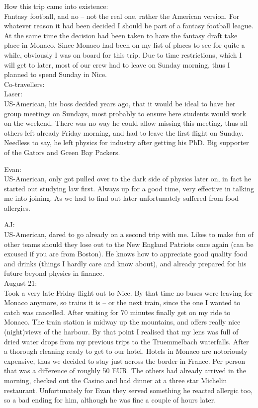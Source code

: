 How this trip came into existence:\\
Fantasy football, and no -- not the real one, rather the American version. For whatever reason it had been decided I should be part of a fantasy football league. At the same time the decision had been taken to have the fantasy draft take place in Monaco. Since Monaco had been on my list of places to see for quite a while, obviously I was on board for this trip. Due to time restrictions, which I will get to later, most of our crew had to leave on Sunday morning, thus I planned to spend Sunday in Nice. \\

Co-travellers: \\
Laser:\\
US-American, his boss decided years ago, that it would be ideal to have her group meetings on Sundays, most probably to ensure here students would work on the weekend. There was no way he could allow missing this meeting, thus all others left already Friday morning, and had to leave the first flight on Sunday. Needless to say, he left physics for industry after getting his PhD. Big supporter of the Gators and Green Bay Packers.

Evan:\\
US-American, only got pulled over to the dark side of physics later on, in fact he started out studying law first. Always up for a good time, very effective in talking me into joining. As we had to find out later unfortunately suffered from food allergies.

AJ:\\
US-American, dared to go already on a second trip with me. Likes to make fun of other teams should they lose out to the New England Patriots once again (can be excused if you are from Boston). He knows how to appreciate good quality food and drinks (things I hardly care and know about), and already prepared for his future beyond physics in finance.\\

August 21:\\
Took a very late Friday flight out to Nice. By that time no buses were leaving for Monaco anymore, so trains it is -- or the next train, since the one I wanted to catch was cancelled. After waiting for 70 minutes finally get on my ride to Monaco. The train station is midway up the mountains, and offers really nice (night)views of the harbour. By that point I realised that my lens was full of dried water drops from my previous trips to the Truemmelbach waterfalls. After a thorough cleaning ready to get to our hotel. Hotels in Monaco are notoriously expensive, thus we decided to stay just across the border in France. Per person that was a difference of roughly 50 EUR. The others had already arrived in the morning, checked out the Casino and had dinner at a three star Michelin restaurant. Unfortunately for Evan they served something he reacted allergic too, so a bad ending for him, although he was fine a couple of hours later.\\

